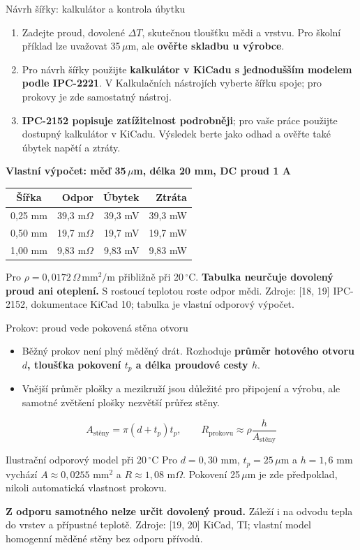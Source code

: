 \documentclass{beamer}
\begin{document}
\begin{frame}[t]{Návrh šířky: kalkulátor a kontrola úbytku}
	\footnotesize
	\begin{enumerate}
		\item Zadejte proud, dovolené $\Delta T$, skutečnou tloušťku mědi a vrstvu. Pro školní příklad lze uvažovat 35\,$\mu$m, ale \textbf{ověřte skladbu u výrobce}.
		\item Pro návrh šířky použijte \textbf{kalkulátor v KiCadu s jednodušším modelem podle IPC-2221}. V Kalkulačních nástrojích vyberte šířku spoje; pro prokovy je zde samostatný nástroj.
		\item \textbf{IPC-2152 popisuje zatížitelnost podrobněji}; pro vaše práce použijte dostupný kalkulátor v KiCadu. Výsledek berte jako odhad a ověřte také úbytek napětí a ztráty.
	\end{enumerate}
	\medskip
	{\centering
	\textbf{Vlastní výpočet: měď 35\,$\mu$m, délka 20 mm, DC proud 1 A}\par\smallskip
	\begin{tabular}{c|r|r|r}
		Šířka & Odpor & Úbytek & Ztráta\\\hline
		0,25 mm & 39,3 m$\Omega$ & 39,3 mV & 39,3 mW\\
		0,50 mm & 19,7 m$\Omega$ & 19,7 mV & 19,7 mW\\
		1,00 mm & 9,83 m$\Omega$ & 9,83 mV & 9,83 mW
	\end{tabular}\par}
	\medskip
	Pro $\rho=0{,}0172\,\Omega\,\text{mm}^2/\text{m}$ přibližně při 20\,$^\circ$C. \textbf{Tabulka neurčuje dovolený proud ani oteplení.} S rostoucí teplotou roste odpor mědi.
	\vfill
	{\tiny Zdroje: [18, 19] IPC-2152, dokumentace KiCad 10; tabulka je vlastní odporový výpočet.}
\end{frame}

\begin{frame}[t]{Prokov: proud vede pokovená stěna otvoru}
	\small
	\begin{itemize}
		\item Běžný prokov není plný měděný drát. Rozhoduje \textbf{průměr hotového otvoru $d$, tloušťka pokovení $t_p$ a délka proudové cesty $h$}.
		\item Vnější průměr plošky a mezikruží jsou důležité pro připojení a výrobu, ale samotné zvětšení plošky nezvětší průřez stěny.
	\end{itemize}
	\[
		A_{\text{stěny}}=\pi(d+t_p)t_p,\qquad R_{\text{prokovu}}\approx\rho\frac{h}{A_{\text{stěny}}}
	\]
	\begin{block}{Ilustrační odporový model při 20\,$^\circ$C}
	Pro $d=0{,}30$ mm, $t_p=25\,\mu$m a $h=1{,}6$ mm vychází $A\approx0{,}0255$ mm$^2$ a $R\approx1{,}08$ m$\Omega$. Pokovení 25\,$\mu$m je zde předpoklad, nikoli automatická vlastnost prokovu.
	\end{block}
	\textbf{Z odporu samotného nelze určit dovolený proud.} Záleží i na odvodu tepla do vrstev a přípustné teplotě.
	\vfill
	{\tiny Zdroje: [19, 20] KiCad, TI; vlastní model homogenní měděné stěny bez odporu přívodů.}
\end{frame}
\end{document}
